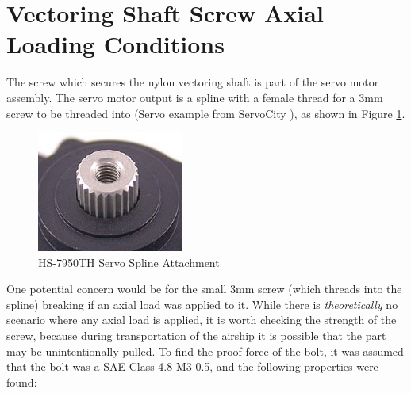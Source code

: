 \documentclass[../main.tex]{subfiles}
\begin{document}
\section{Vectoring Shaft Screw Axial Loading Conditions}
The screw which secures the nylon vectoring shaft is part of the servo motor assembly. The servo motor output is a spline with a female thread for a 3mm screw to be threaded into (Servo example from ServoCity \cite{SPLINE}), as shown in Figure \ref{fig:servoSpline}.

\begin{figure}[H]
	\centering
	\includegraphics[width=.5\linewidth]{img/servo/spline.PNG}
	\caption{HS-7950TH Servo Spline Attachment \cite{SPLINE}}
	\label{fig:servoSpline}
\end{figure}

One potential concern would be for the small 3mm screw (which threads into the spline) breaking if an axial load was applied to it. While there is \textit{theoretically} no scenario where any axial load is applied, it is worth checking the strength of the screw, because during transportation of the airship it is possible that the part may be unintentionally pulled. To find the proof force of the bolt, it was assumed that the bolt was a SAE Class 4.8 M3-0.5, and the following properties were found:
\end{document}

